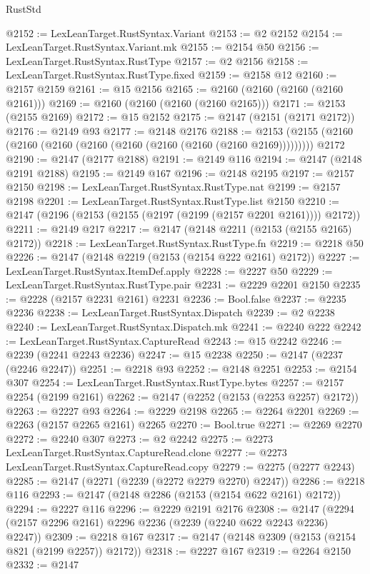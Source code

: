 \begin{lexlean}{RustStd}
\begin{coremodule}
@2152 := LexLeanTarget.RustSyntax.Variant
@2153 := @2 @2152
@2154 := LexLeanTarget.RustSyntax.Variant.mk
@2155 := @2154 @50
@2156 := LexLeanTarget.RustSyntax.RustType
@2157 := @2 @2156
@2158 := LexLeanTarget.RustSyntax.RustType.fixed
@2159 := @2158 @12
@2160 := @2157 @2159
@2161 := @15 @2156
@2165 := @2160 (@2160 (@2160 (@2160 @2161)))
@2169 := @2160 (@2160 (@2160 (@2160 @2165)))
@2171 := @2153 (@2155 @2169)
@2172 := @15 @2152
@2175 := @2147 (@2151 (@2171 @2172))
@2176 := @2149 @93
@2177 := @2148 @2176
@2188 := @2153 (@2155 (@2160 (@2160 (@2160 (@2160 (@2160 (@2160 (@2160 (@2160 @2169))))))))) @2172
@2190 := @2147 (@2177 @2188)
@2191 := @2149 @116
@2194 := @2147 (@2148 @2191 @2188)
@2195 := @2149 @167
@2196 := @2148 @2195
@2197 := @2157 @2150
@2198 := LexLeanTarget.RustSyntax.RustType.nat
@2199 := @2157 @2198
@2201 := LexLeanTarget.RustSyntax.RustType.list @2150
@2210 := @2147 (@2196 (@2153 (@2155 (@2197 (@2199 (@2157 @2201 @2161)))) @2172))
@2211 := @2149 @217
@2217 := @2147 (@2148 @2211 (@2153 (@2155 @2165) @2172))
@2218 := LexLeanTarget.RustSyntax.RustType.fn
@2219 := @2218 @50
@2226 := @2147 (@2148 @2219 (@2153 (@2154 @222 @2161) @2172))
@2227 := LexLeanTarget.RustSyntax.ItemDef.apply
@2228 := @2227 @50
@2229 := LexLeanTarget.RustSyntax.RustType.pair
@2231 := @2229 @2201 @2150
@2235 := @2228 (@2157 @2231 @2161) @2231
@2236 := Bool.false
@2237 := @2235 @2236
@2238 := LexLeanTarget.RustSyntax.Dispatch
@2239 := @2 @2238
@2240 := LexLeanTarget.RustSyntax.Dispatch.mk
@2241 := @2240 @222
@2242 := LexLeanTarget.RustSyntax.CaptureRead
@2243 := @15 @2242
@2246 := @2239 (@2241 @2243 @2236)
@2247 := @15 @2238
@2250 := @2147 (@2237 (@2246 @2247))
@2251 := @2218 @93
@2252 := @2148 @2251
@2253 := @2154 @307
@2254 := LexLeanTarget.RustSyntax.RustType.bytes
@2257 := @2157 @2254 (@2199 @2161)
@2262 := @2147 (@2252 (@2153 (@2253 @2257) @2172))
@2263 := @2227 @93
@2264 := @2229 @2198
@2265 := @2264 @2201
@2269 := @2263 (@2157 @2265 @2161) @2265
@2270 := Bool.true
@2271 := @2269 @2270
@2272 := @2240 @307
@2273 := @2 @2242
@2275 := @2273 LexLeanTarget.RustSyntax.CaptureRead.clone
@2277 := @2273 LexLeanTarget.RustSyntax.CaptureRead.copy
@2279 := @2275 (@2277 @2243)
@2285 := @2147 (@2271 (@2239 (@2272 @2279 @2270) @2247))
@2286 := @2218 @116
@2293 := @2147 (@2148 @2286 (@2153 (@2154 @622 @2161) @2172))
@2294 := @2227 @116
@2296 := @2229 @2191 @2176
@2308 := @2147 (@2294 (@2157 @2296 @2161) @2296 @2236 (@2239 (@2240 @622 @2243 @2236) @2247))
@2309 := @2218 @167
@2317 := @2147 (@2148 @2309 (@2153 (@2154 @821 (@2199 @2257)) @2172))
@2318 := @2227 @167
@2319 := @2264 @2150
@2332 := @2147

\end{coremodule}
\end{lexlean}
